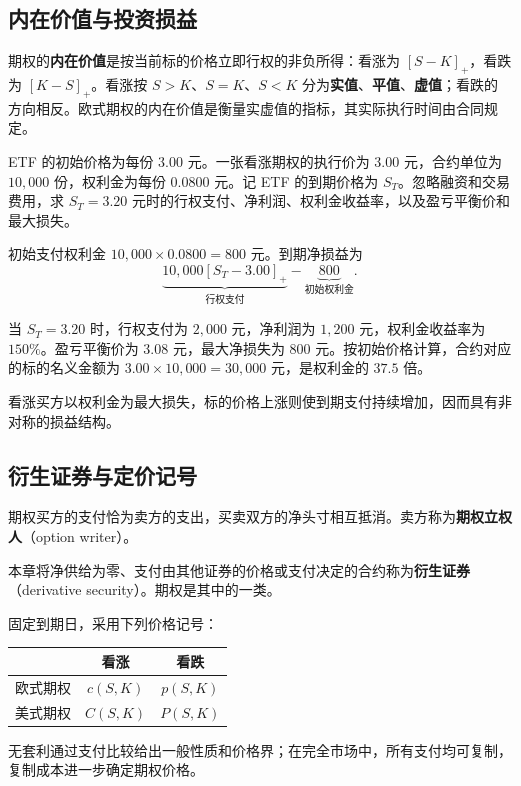 \subsection{内在价值与投资损益}
\begin{tcolorbox}[knowledge,title=内在价值与实值、平值、虚值]
期权的\textbf{内在价值}是按当前标的价格立即行权的非负所得：看涨为 $[S-K]_+$，看跌为 $[K-S]_+$。看涨按 $S>K$、$S=K$、$S<K$ 分为\textbf{实值}、\textbf{平值}、\textbf{虚值}；看跌的方向相反。欧式期权的内在价值是衡量实虚值的指标，其实际执行时间由合同规定。
\end{tcolorbox}
\begin{tcolorbox}[example,title=课堂例题：ETF 期权的支付与损益]
\begin{question}
ETF 的初始价格为每份 $3.00$ 元。一张看涨期权的执行价为 $3.00$ 元，合约单位为 $10{,}000$ 份，权利金为每份 $0.0800$ 元。记 ETF 的到期价格为 $S_T$。忽略融资和交易费用，求 $S_T=3.20$ 元时的行权支付、净利润、权利金收益率，以及盈亏平衡价和最大损失。
\end{question}
\begin{solution}
初始支付权利金 $10{,}000\times0.0800=800$ 元。到期净损益为
\[
 \underbrace{10{,}000[S_T-3.00]_+}_{\text{行权支付}}-\underbrace{800}_{\text{初始权利金}}.
\]

当 $S_T=3.20$ 时，行权支付为 $2{,}000$ 元，净利润为 $1{,}200$ 元，权利金收益率为 $150\%$。盈亏平衡价为 $3.08$ 元，最大净损失为 $800$ 元。按初始价格计算，合约对应的标的名义金额为 $3.00\times10{,}000=30{,}000$ 元，是权利金的 $37.5$ 倍。
\end{solution}
\end{tcolorbox}

看涨买方以权利金为最大损失，标的价格上涨则使到期支付持续增加，因而具有非对称的损益结构。

\subsection{衍生证券与定价记号}
期权买方的支付恰为卖方的支出，买卖双方的净头寸相互抵消。卖方称为\textbf{期权立权人}（option writer）。
\begin{tcolorbox}[knowledge,title=衍生证券]
本章将净供给为零、支付由其他证券的价格或支付决定的合约称为\textbf{衍生证券}（derivative security）。期权是其中的一类。
\end{tcolorbox}
\begin{tcolorbox}[knowledge,title=期权价格记号]
固定到期日，采用下列价格记号：
\begin{center}
\begin{tabular}{c|cc}
 & 看涨 & 看跌\\\hline
 欧式期权 & $c(S,K)$ & $p(S,K)$\\
 美式期权 & $C(S,K)$ & $P(S,K)$
\end{tabular}
\end{center}
\end{tcolorbox}
无套利通过支付比较给出一般性质和价格界；在完全市场中，所有支付均可复制，复制成本进一步确定期权价格。

